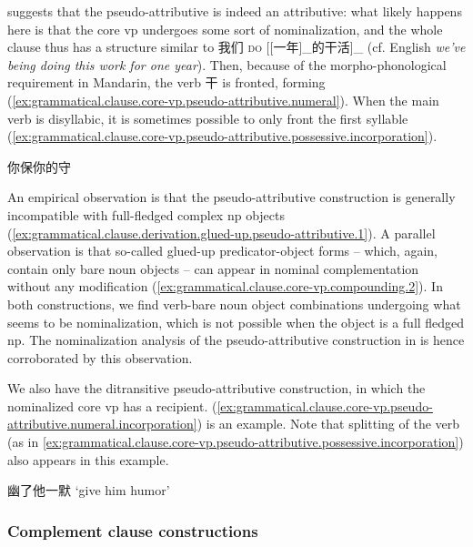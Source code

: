 \documentclass[UTF8, a4paper, oneside, scheme=plain, 12pt]{ctexrep}
\newcommand{\form}[1]{\emph{#1}}
\newcommand{\translate}[1]{`#1'}
\newcommand*{\category}[1]{\textsc{#1}}
\begin{document}
\citet{huang2008} suggests that the pseudo-attributive is indeed an attributive:
what likely happens here is that the core \ac{vp} undergoes some sort of nominalization,
and the whole clause thus has a structure similar to 
我们 \category{do} [[一年]_{}的干活]_{} 
(cf. English \form{we've being doing this work for one year}).
Then, because of the morpho-phonological requirement in Mandarin,
the verb 干 is fronted, forming (\ref{ex:grammatical.clause.core-vp.pseudo-attributive.numeral}).
When the main verb is disyllabic, it is sometimes possible to only front the first syllable
(\ref{ex:grammatical.clause.core-vp.pseudo-attributive.possessive.incorporation}).

\begin{exe}
    \ex\label{ex:grammatical.clause.core-vp.pseudo-attributive.possessive.incorporation} 你保你的守
\end{exe}

An empirical observation is that the pseudo-attributive construction
is generally incompatible with full-fledged complex \ac{np} objects
(\ref{ex:grammatical.clause.derivation.glued-up.pseudo-attributive.1}).
A parallel observation is that 
so-called glued-up predicator-object forms -- which, again, contain only bare noun objects --
can appear in nominal complementation without any modification
(\ref{ex:grammatical.clause.core-vp.compounding.2}).
In both constructions, we find verb-bare noun object combinations undergoing
what seems to be nominalization,
which is not possible when the object is a full fledged \ac{np}.
The nominalization analysis of the pseudo-attributive construction in \citet{huang2008}
is hence corroborated by this observation.

We also have the ditransitive pseudo-attributive construction,
in which the nominalized core \ac{vp} has a recipient.
(\ref{ex:grammatical.clause.core-vp.pseudo-attributive.numeral.incorporation})
is an example.
Note that splitting of the verb (as in \ref{ex:grammatical.clause.core-vp.pseudo-attributive.possessive.incorporation}) also appears in this example.

\begin{exe}
    \ex\label{ex:grammatical.clause.core-vp.pseudo-attributive.numeral.incorporation} 幽了他一默 \translate{give him humor}
\end{exe}

\subsubsection{Complement clause constructions}\label{sec:grammatical.clause.core-vp.complement-clause}
\end{document}
